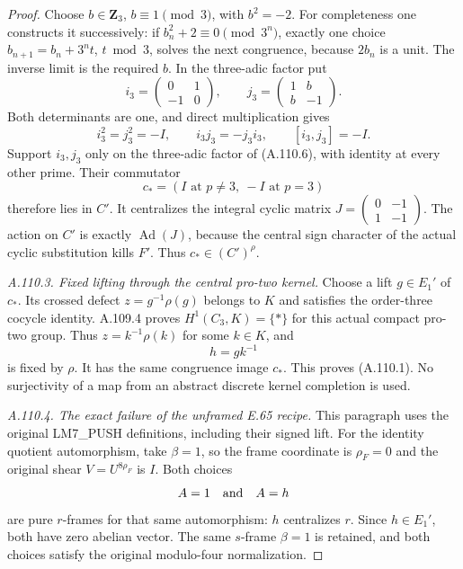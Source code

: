 \begin{proof}
Choose \(b\in\mathbf Z_3\), \(b\equiv1\pmod3\), with \(b^2=-2\).
For completeness one constructs it successively: if
\(b_n^2+2\equiv0\pmod{3^n}\), exactly one choice
\(b_{n+1}=b_n+3^nt\), \(t\bmod3\), solves the next congruence,
because \(2b_n\) is a unit. The inverse limit is the required \(b\).
In the three-adic factor put
\[
 i_3=\begin{pmatrix}0&1\\-1&0\end{pmatrix},\qquad
 j_3=\begin{pmatrix}1&b\\b&-1\end{pmatrix}.
 \tag{A.110.7}
\]
Both determinants are one, and direct multiplication gives
\[
 i_3^2=j_3^2=-I,\qquad i_3j_3=-j_3i_3,\qquad
 [i_3,j_3]=-I.
 \tag{A.110.8}
\]
Support \(i_3,j_3\) only on the three-adic factor of (A.110.6),
with identity at every other prime. Their commutator
\[
 c_*=(I\text{ at }p\ne3,\ -I\text{ at }p=3)
 \]
therefore lies in \(C'\). It centralizes the integral cyclic
matrix \(J=\left(\begin{smallmatrix}0&-1\\1&-1\end{smallmatrix}\right)\).
The action on \(C'\) is exactly \(\operatorname{Ad}(J)\), because
the central sign character of the actual cyclic substitution
kills \(F'\). Thus \(c_*\in(C')^\rho\).

\emph{A.110.3. Fixed lifting through the central pro-two kernel.}
Choose a lift \(g\in E_1'\) of \(c_*\). Its crossed defect
\(z=g^{-1}\rho(g)\) belongs to \(K\) and satisfies the order-three
cocycle identity. A.109.4 proves \(H^1(C_3,K)=\{*\}\) for this
actual compact pro-two group. Thus \(z=k^{-1}\rho(k)\) for some
\(k\in K\), and
\[
 h=gk^{-1}
 \]
is fixed by \(\rho\). It has the same congruence image \(c_*\).
This proves (A.110.1). No surjectivity of a map from an abstract
discrete kernel completion is used.

\emph{A.110.4. The exact failure of the unframed E.65 recipe.}
This paragraph uses the original LM7\_PUSH definitions, including
their signed lift. For the identity quotient automorphism, take
\(\beta=1\), so the frame coordinate is \(\rho_F=0\) and the
original shear \(V=U^{8\rho_F}\) is \(I\). Both choices
\[
 A=1\quad\hbox{and}\quad A=h
 \]
are pure \(r\)-frames for that same automorphism: \(h\) centralizes
\(r\). Since \(h\in E_1'\), both have zero abelian vector. The
same \(s\)-frame \(\beta=1\) is retained, and both choices satisfy
the original modulo-four normalization.


\end{proof}
